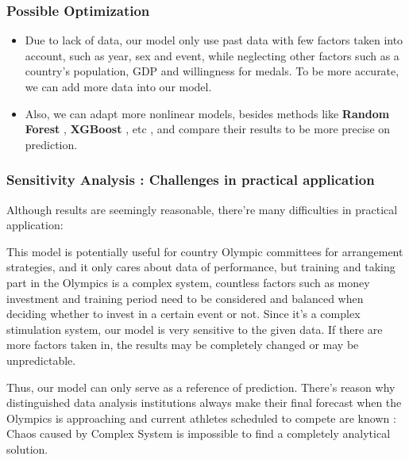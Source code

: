 \subsubsection{Possible Optimization}
\begin{itemize}
    \item Due to lack of data, our model only use past data with few factors taken into account, such as year, sex and event, while neglecting other factors such as a country's population, GDP and willingness 
for medals. To be more accurate, we can add more data into our model.

    \item  Also, we can adapt more nonlinear models, besides methods like \textbf{Random Forest} , \textbf{XGBoost} , etc
    , and compare their results to be more precise on prediction.
 
    
    \end{itemize}


\subsubsection{Sensitivity Analysis : Challenges in practical application}
Although results are seemingly reasonable, there're many difficulties in practical application:

This model is potentially useful for country Olympic committees for arrangement strategies, and it only cares about data of performance, but training and taking part in the 
Olympics is a complex system, countless factors such as money investment and training period need to be considered and balanced when deciding whether to invest in a certain event or not. Since it's a complex stimulation system, our model is very sensitive to the given data. If there are more factors taken in, the results may be completely changed or may be unpredictable.

Thus, our model can only serve as a reference of prediction. There's reason why distinguished data analysis institutions always make their final forecast when the Olympics is approaching and current athletes
scheduled to compete are known : Chaos caused by Complex System is impossible to find a completely analytical solution. 